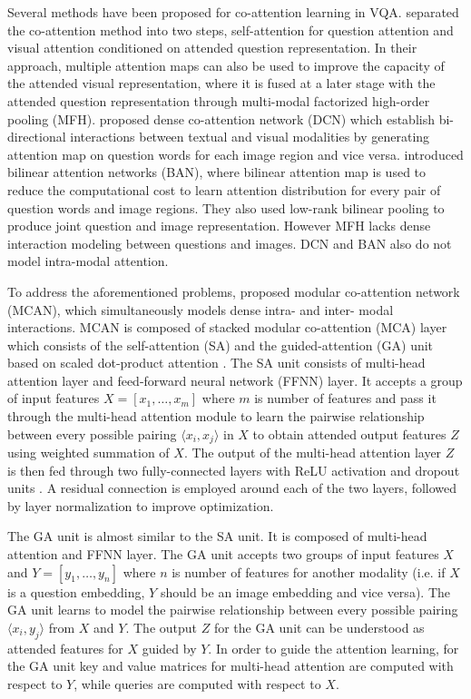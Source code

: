 \documentclass{article}
\begin{document}
Several methods have been proposed for co-attention learning in VQA. \citet{yu2018beyond} separated the co-attention method into two steps, self-attention for question attention and visual attention conditioned on attended question representation. In their approach, multiple attention maps can also be used to improve the capacity of the attended visual representation, where it is fused at a later stage with the attended question representation through multi-modal factorized high-order pooling (MFH). \citet{Nguyen_2018_CVPR} proposed dense co-attention network (DCN) which establish bi-directional interactions between textual and visual modalities by generating attention map on question words for each image region and vice versa. \citet{ban} introduced bilinear attention networks (BAN), where bilinear attention map is used to reduce the computational cost to learn attention distribution for every pair of question words and image regions. They also used low-rank bilinear pooling to produce joint question and image representation. However MFH lacks dense interaction modeling between questions and images. DCN and BAN also do not model intra-modal attention.

To address the aforementioned problems, \citet{yu2019mcan} proposed modular co-attention network (MCAN), which simultaneously models dense intra- and inter- modal interactions. MCAN is composed of stacked modular co-attention (MCA) layer which consists of the self-attention (SA) and the guided-attention (GA) unit based on scaled dot-product attention \citep{transformers}. The SA unit consists of multi-head attention layer and feed-forward neural network (FFNN) layer. It accepts a group of input features $X = [x_{1}, \dots, x_{m}]$ where $m$ is number of features and pass it through the multi-head attention module to learn the pairwise relationship between every possible pairing $\langle x_{i},x_{j} \rangle$ in $X$ to obtain attended output features $Z$ using weighted summation of $X$. The output of the multi-head attention layer $Z$ is then fed through two fully-connected layers with ReLU activation \citep{relu} and dropout units \citep{dropout}. A residual connection \citep{residual} is employed around each of the two layers, followed by layer normalization \citep{ba2016layer} to improve optimization.

The GA unit is almost similar to the SA unit. It is composed of multi-head attention and FFNN layer. The GA unit accepts two groups of input features $X$ and $Y = [y_{1}, \dots, y_{n}]$ where $n$ is number of features for another modality (i.e. if $X$ is a question embedding, $Y$ should be an image embedding and vice versa). The GA unit learns to model the pairwise relationship between every possible pairing $\langle x_{i},y_{j} \rangle$ from $X$ and $Y$. The output $Z$ for the GA unit can be understood as attended features for $X$ guided by $Y$. In order to guide the attention learning, for the GA unit key and value matrices for multi-head attention are computed with respect to $Y$, while queries are computed with respect to $X$. 
\end{document}
